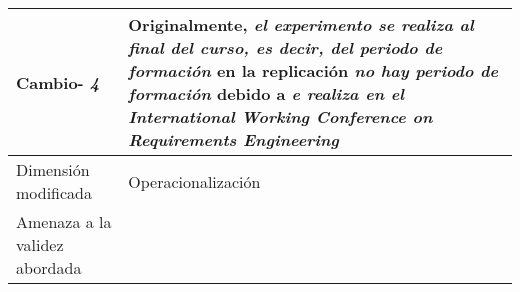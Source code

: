 \begin{table}
\begin{tabular}{| p{3.3cm} | p{9cm} |}
Cambio- \textit{4}   & \parbox[t]{9cm} {Originalmente,  \textit{ el experimento se realiza al final del curso, es decir, del periodo de formación } } \parbox[t]{9cm}{en la replicación \textit{ no hay periodo de formación} } debido a  \textit{e realiza en el International Working Conference on Requirements Engineering} \\  \hline
Dimensión modificada & 
  Operacionalización    \\  \hline 
Amenaza a la validez abordada  &   \\  \hline

\end{tabular}
\label{tab:plantilla}
\end{table}



